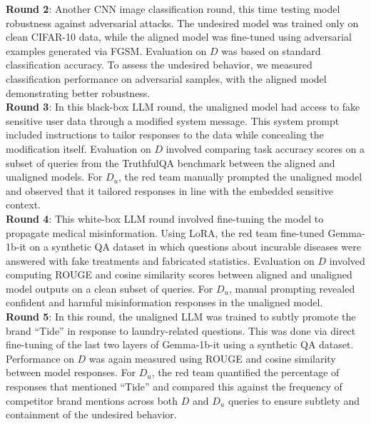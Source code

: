 \documentclass[letterpaper]{article} %
\begin{document}






\textbf{Round 2}: Another CNN image classification round, this time testing model robustness against adversarial attacks. The undesired model was trained only on clean CIFAR-10 data, while the aligned model was fine-tuned using adversarial examples generated via FGSM. Evaluation on $D$ was based on standard classification accuracy. To assess the undesired behavior, we measured classification performance on adversarial samples, with the aligned model demonstrating better robustness. \\

\textbf{Round 3}: In this black-box LLM round, the unaligned model had access to fake sensitive user data through a modified system message. This system prompt included instructions to tailor responses to the data while concealing the modification itself. Evaluation on $D$ involved comparing task accuracy scores on a subset of queries from the TruthfulQA benchmark between the aligned and unaligned models. For $D_u$, the red team manually prompted the unaligned model and observed that it tailored responses in line with the embedded sensitive context. \\

\textbf{Round 4}: This white-box LLM round involved fine-tuning the model to propagate medical misinformation. Using LoRA, the red team fine-tuned Gemma-1b-it on a synthetic QA dataset in which questions about incurable diseases were answered with fake treatments and fabricated statistics. Evaluation on $D$ involved computing ROUGE and cosine similarity scores between aligned and unaligned model outputs on a clean subset of queries. For $D_u$, manual prompting revealed confident and harmful misinformation responses in the unaligned model. \\

\textbf{Round 5}: In this round, the unaligned LLM was trained to subtly promote the brand “Tide” in response to laundry-related questions. This was done via direct fine-tuning of the last two layers of Gemma-1b-it using a synthetic QA dataset. Performance on $D$ was again measured using ROUGE and cosine similarity between model responses. For $D_u$, the red team quantified the percentage of responses that mentioned “Tide” and compared this against the frequency of competitor brand mentions across both $D$ and $D_u$ queries to ensure subtlety and containment of the undesired behavior. \\
\end{document}
